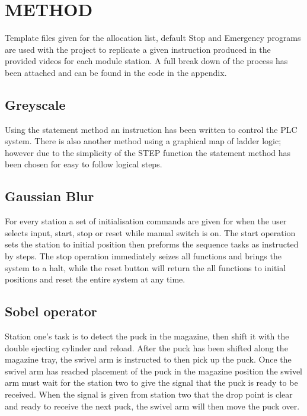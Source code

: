 \documentclass[a4paper, 10pt]{article}
\begin{document}

\section{METHOD}
Template files given for the allocation list, default Stop and Emergency programs are used with the project to replicate a given instruction produced in the provided videos for each module station. A full break down of the process has been attached and can be found in the code in the appendix.



\subsection{Greyscale}
Using the statement method an instruction has been written to control the PLC system. There is also another method using a graphical map of ladder logic; however due to the simplicity of the STEP function the statement method has been chosen for easy to follow logical steps.



\subsection{Gaussian Blur}
For every station a set of initialisation commands are given for when the user selects input, start, stop or reset while manual switch is on. The start operation sets the station to initial position then preforms the sequence tasks as instructed by steps. The stop operation immediately seizes all functions and brings the system to a halt, while the reset button will return the all functions to initial positions and reset the entire system at any time. 



\subsection{Sobel operator}

Station one's task is to detect the puck in the magazine, then shift it with the double ejecting cylinder and reload. After the puck has been shifted along the magazine tray, the swivel arm is instructed to then pick up the puck. Once the swivel arm has reached placement of the puck in the magazine position the swivel arm must wait for the station two to give the signal that the puck is ready to be received. When the signal is given from station two that the drop point is clear and ready to receive the next puck, the swivel arm will then move the puck over. 
\end{document}
